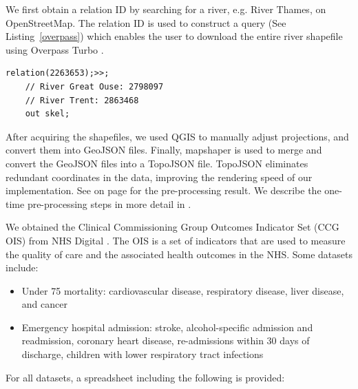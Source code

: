 We first obtain a relation ID by searching for a river, e.g. River Thames, on OpenStreetMap. The relation ID is used to construct a query (See Listing~\ref{overpass}) which enables the user to download the entire river shapefile using Overpass Turbo \cite{overpassturboOverpass}.

\begin{lstlisting}[float=tp,caption={The query that downloads the shapefile of River Thames from OpenStreetMap via the Overpass Turbo API.}, label={overpass},captionpos=b]
    relation(2263653);>>;
    // River Great Ouse: 2798097
    // River Trent: 2863468
    out skel;
\end{lstlisting}

After acquiring the shapefiles, we used QGIS \cite{qgisWelcome} to manually adjust projections, and convert them into GeoJSON files. Finally, mapshaper \cite{blochMapshaper} is used to merge and convert the GeoJSON files into a TopoJSON \cite{TopoJSON} file. TopoJSON eliminates redundant coordinates in the data, improving the rendering speed of our implementation. See  on page \pageref{table:pre-processing_result} for the pre-processing result. We describe the one-time pre-processing steps in more detail in .

We obtained the Clinical Commissioning Group Outcomes Indicator Set (CCG OIS) from NHS Digital \cite{nhsdigitalClinical}. The OIS is a set of indicators that are used to measure the quality of care and the associated health outcomes in the NHS. Some datasets include:
\begin{itemize}
    \item Under 75 mortality: cardiovascular disease, respiratory disease, liver disease, and cancer
    \item Emergency hospital admission: stroke, alcohol-specific admission and readmission, coronary heart disease, re-admissions within 30 days of discharge, children with lower respiratory tract infections
\end{itemize}

For all datasets, a spreadsheet including the following is provided:

